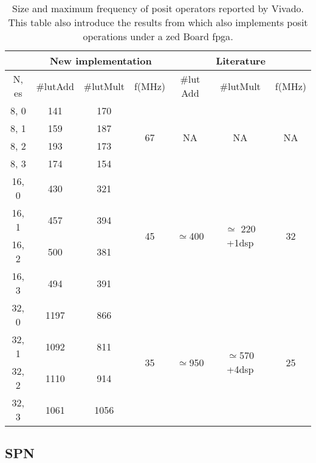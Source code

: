\begin{table}[!ht]
\centering
\caption{Size and maximum frequency of posit operators reported by Vivado. This table also introduce the results from \cite{other_fpga} which also implements posit operations under a zed Board \gls{fpga}.}
	\label{tab:res_add}
	\begin{tabular}{|c||c|c|c||c|c|c|}
	\hline
		& \multicolumn{3}{c||}{New implementation} & \multicolumn{3}{c|}{Literature \cite{other_fpga}} \\ \hline
		N, es & \#\gls{lut}Add & \#\gls{lut}Mult & f(MHz) & \#\gls{lut} Add & \#\gls{lut}Mult & f(MHz) \\ \hline
		8, 0 & 141 & 170 & \multirow{4}{*}{67} & \multirow{4}{*}{NA} & \multirow{4}{*}{NA} & \multirow{4}{*}{NA} \\
		8, 1 & 159 & 187 & & & & \\
		8, 2 & 193 & 173 & & & & \\
		8, 3 & 174 & 154 & & & & \\ \hline
		16, 0 & 430 & 321 & \multirow{4}{*}{45} & \multirow{4}{*}{$\simeq$400} & \multirow{4}{*}{\parbox{1.5cm}{$\simeq$ 220 +1\gls{dsp}}} & \multirow{4}{*}{32} \\
		16, 1 & 457 & 394 & & & & \\
		16, 2 & 500 & 381 & & & & \\
		16, 3 & 494 & 391 & & & & \\ \hline
		32, 0 & 1197 & 866 & \multirow{4}{*}{35} & \multirow{4}{*}{$\simeq$950} & \multirow{4}{*}{\parbox{1.5cm}{$\simeq$570 +4\gls{dsp}}} & \multirow{4}{*}{25} \\
		32, 1 & 1092 & 811 & & & & \\
		32, 2 & 1110 & 914 & & & & \\
		32, 3 & 1061 & 1056 & & & & \\ \hline
 	\end{tabular}
\end{table}

\subsection{SPN}





